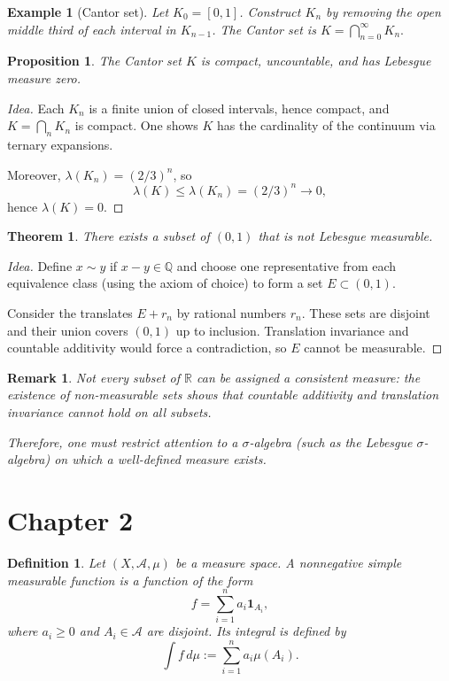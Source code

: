 \documentclass[12pt]{article}
\newtheorem{theorem}{Theorem}
\newtheorem{definition}{Definition}
\newtheorem{proposition}{Proposition}
\newtheorem{remark}{Remark}
\newtheorem{example}{Example}
\begin{document}
\begin{example}[Cantor set]
Let $K_0 = [0,1]$. Construct $K_n$ by removing the open middle third of each
interval in $K_{n-1}$. The \emph{Cantor set} is
\(
K = \bigcap_{n=0}^\infty K_n.
\)
\end{example}

\begin{proposition}
The Cantor set $K$ is compact, uncountable, and has Lebesgue measure zero.
\end{proposition}

\begin{proof}[Idea]
Each $K_n$ is a finite union of closed intervals, hence compact, and
$K = \bigcap_n K_n$ is compact. One shows $K$ has the cardinality of the
continuum via ternary expansions.

Moreover, $\lambda(K_n) = (2/3)^n$, so
\[
\lambda(K) \le \lambda(K_n) = (2/3)^n \to 0,
\]
hence $\lambda(K)=0$.
\end{proof}

\begin{theorem}
There exists a subset of $(0,1)$ that is not Lebesgue measurable.
\end{theorem}

\begin{proof}[Idea]
Define $x \sim y$ if $x-y \in \mathbb{Q}$ and choose one representative from
each equivalence class (using the axiom of choice) to form a set $E \subset (0,1)$.

Consider the translates $E + r_n$ by rational numbers $r_n$. These sets are
disjoint and their union covers $(0,1)$ up to inclusion. Translation invariance
and countable additivity would force a contradiction, so $E$ cannot be measurable.
\end{proof}

\begin{remark}
Not every subset of $\mathbb{R}$ can be assigned a consistent measure: the
existence of non-measurable sets shows that countable additivity and translation
invariance cannot hold on all subsets. 

Therefore, one must restrict attention to a $\sigma$-algebra (such as the
Lebesgue $\sigma$-algebra) on which a well-defined measure exists.
\end{remark}

\section*{Chapter 2}
\begin{definition}
Let $(X,\mathcal{A},\mu)$ be a measure space. A nonnegative simple measurable
function is a function of the form
\[
f = \sum_{i=1}^n a_i \mathbf{1}_{A_i},
\]
where $a_i \ge 0$ and $A_i \in \mathcal{A}$ are disjoint. Its integral is defined by
\[
\int f\,d\mu := \sum_{i=1}^n a_i\mu(A_i).
\]
\end{definition}
\end{document}

